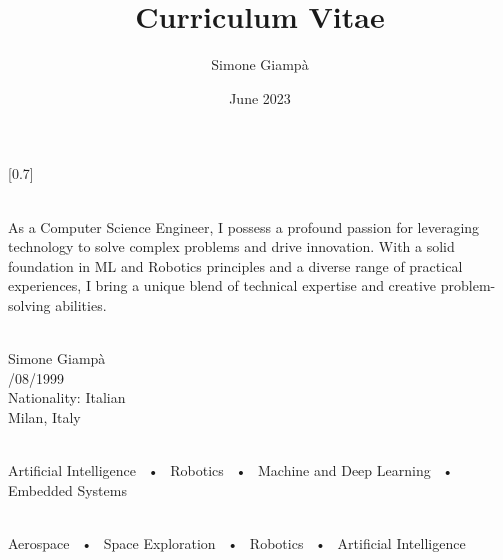 \documentclass[pastel]{simplehipstercv}
\title{Curriculum Vitae}
\author{Simone Giampà}
\date{June 2023}
\begin{document}
\thispagestyle{empty}

\section*{}



\subsection*{}
\vspace{4em}
\setlength{\columnsep}{3em}
[0.7]
\begin{paracol}{2}

\paracolbackgroundoptions

\footnotesize
{
\flushright
\color{black}
\\[0.5em]
As a Computer Science Engineer, I possess a profound passion for leveraging technology to solve complex problems and drive innovation. With a solid foundation in ML and Robotics principles and a diverse range of practical experiences, I bring a unique blend of technical expertise and creative problem-solving abilities.
\bigskip

 \\[0.3em]
Simone Giampà \\
\vspace{0.2em}
\faBirthdayCake {}/08/1999 \\
\vspace{0.2em}
\faGlobe \; Nationality: Italian \\
\vspace{0.2em}
\faMapMarker \; Milan, Italy \\

\bigskip

 \\[0.5em]

Artificial Intelligence ~•~ Robotics ~•~ Machine and Deep Learning ~•~ Embedded Systems

\bigskip

\\[0.5em]

Aerospace ~•~ Space Exploration ~•~ Robotics ~•~ Artificial Intelligence 

}
\end{paracol}
\end{document}
